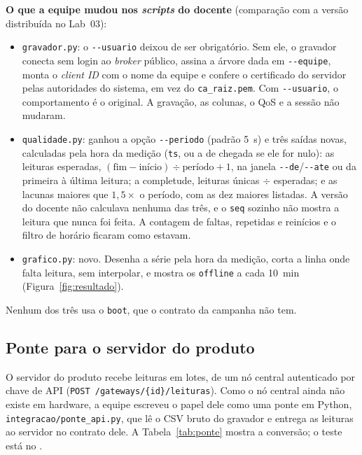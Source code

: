 \textbf{O que a equipe mudou nos \emph{scripts} do docente}
(comparação com a versão distribuída no Lab~03):

\begin{itemize}
  \item \texttt{gravador.py}: o \texttt{-{}-usuario} deixou de ser
    obrigatório. Sem ele, o gravador conecta sem login ao \emph{broker}
    público, assina a árvore dada em \texttt{-{}-equipe}, monta o
    \emph{client ID} com o nome da equipe e confere o certificado do
    servidor pelas autoridades do sistema, em vez do
    \texttt{ca\_raiz.pem}. Com \texttt{-{}-usuario}, o comportamento é o
    original. A gravação, as colunas, o QoS e a sessão não mudaram.
  \item \texttt{qualidade.py}: ganhou a opção \texttt{-{}-periodo}
    (padrão \SI{5}{\second}) e três saídas novas, calculadas pela hora
    da medição (\texttt{ts}, ou a de chegada se ele for nulo): as
    leituras esperadas, $(\text{fim} - \text{início}) \div
    \text{período} + 1$, na janela \texttt{-{}-de}/\texttt{-{}-ate} ou da
    primeira à última leitura; a completude, leituras únicas $\div$
    esperadas; e as lacunas maiores que $1{,}5 \times$ o período, com as
    dez maiores listadas. A versão do docente não calculava nenhuma das
    três, e o \texttt{seq} sozinho não mostra a leitura que nunca foi
    feita. A contagem de faltas, repetidas e reinícios e o filtro de
    horário ficaram como estavam.
  \item \texttt{grafico.py}: novo. Desenha a série pela hora da
    medição, corta a linha onde falta leitura, sem interpolar, e mostra
    os \texttt{offline} a cada \SI{10}{\minute}
    (Figura~\ref{fig:resultado}).
\end{itemize}

\noindent Nenhum dos três usa o \texttt{boot}, que o contrato da
campanha não tem.

\subsection{Ponte para o servidor do produto}
\label{sec:ponte}

O servidor do produto recebe leituras em lotes, de um nó central
autenticado por chave de API (\texttt{POST /gateways/\{id\}/leituras}).
Como o nó central ainda não existe em hardware, a equipe escreveu o papel
dele como uma ponte em Python, \texttt{integracao/ponte\_api.py}, que lê
o CSV bruto do gravador e entrega as leituras ao servidor no contrato
dele. A Tabela~\ref{tab:ponte} mostra a conversão; o teste está no
.

